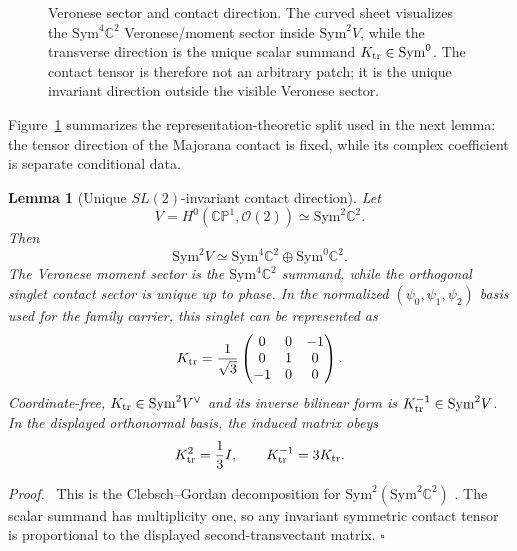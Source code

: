 \documentclass[
  aps,
  prd,
  preprint,
  nofootinbib,
  superscriptaddress,
  longbibliography
]{revtex4-2}
\newcommand{\CP}{\mathbb{CP}}
\newcommand{\cO}{\mathcal{O}}
\newtheorem{lemma}[theorem]{Lemma}
\newenvironment{proof}{\par\noindent\textit{Proof.}\ }{\hfill\(\square\)\par}
\begin{document}
\begin{figure}[!htbp]
\caption{Veronese sector and contact direction.  The curved sheet visualizes
the \(\mathrm{Sym}^4\mathbb C^2\) Veronese/moment sector inside
\(\mathrm{Sym}^2V\), while the transverse direction is the unique scalar
summand \(K_{\rm tr}\in\mathrm{Sym}^0\).  The contact tensor is therefore not
an arbitrary patch; it is the unique invariant direction outside the visible
Veronese sector.}
\label{fig:veronese-contact}
\end{figure}

\FloatBarrier

Figure~\ref{fig:veronese-contact} summarizes the representation-theoretic
split used in the next lemma: the tensor direction of the Majorana contact is
fixed, while its complex coefficient is separate conditional data.

\begin{lemma}[Unique \(SL(2)\)-invariant contact direction]
\label{lem:ktr-contact}
Let
\[
  V=H^0(\CP^1,\cO(2))\simeq \mathrm{Sym}^2\mathbb C^2.
\]
Then
\[
  \mathrm{Sym}^2 V
  \simeq
  \mathrm{Sym}^4\mathbb C^2\oplus \mathrm{Sym}^0\mathbb C^2.
\]
The Veronese moment sector is the \(\mathrm{Sym}^4\mathbb C^2\) summand,
while the orthogonal singlet contact sector is unique up to phase.  In the
normalized \((\psi_0,\psi_1,\psi_2)\) basis used for the family carrier, this
singlet can be represented as
\[
  K_{\rm tr}
  =
  \frac1{\sqrt3}
  \begin{pmatrix}
    0&0&-1\\
    0&1&0\\
    -1&0&0
  \end{pmatrix}.
\]
Coordinate-free, \(K_{\rm tr}\in \mathrm{Sym}^2V^\vee\) and its inverse
bilinear form is \(K_{\rm tr}^{-1}\in \mathrm{Sym}^2V\).  In the displayed
orthonormal basis, the induced matrix obeys
\[
  K_{\rm tr}^2=\frac13 I,\qquad K_{\rm tr}^{-1}=3K_{\rm tr}.
\]
\end{lemma}

\begin{proof}
This is the Clebsch--Gordan decomposition for
\(\mathrm{Sym}^2(\mathrm{Sym}^2\mathbb C^2)\)
\cite{FultonHarris1991}.  The scalar summand has
multiplicity one, so any invariant symmetric contact tensor is proportional to
the displayed second-transvectant matrix.
\end{proof}
\end{document}
